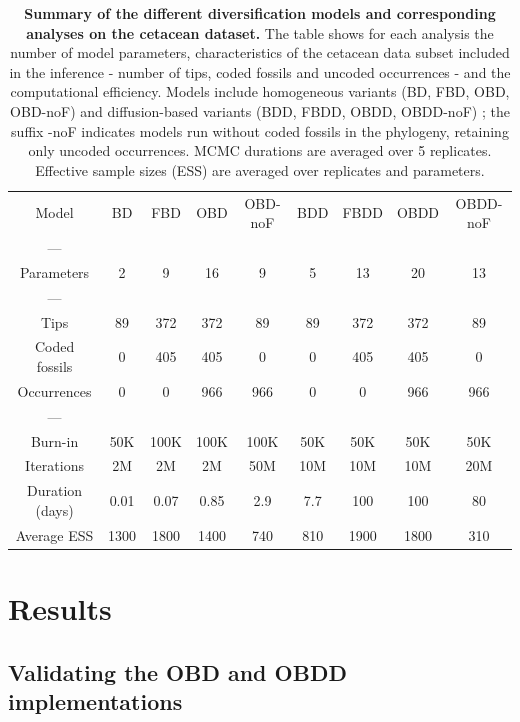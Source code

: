 \documentclass[oupdraft]{sysbio}
\newcommand{\revised}[1]{{\color{blue} #1}}
\begin{document}
\begin{table}[!ht]
    \centering
    \caption{\textbf{Summary of the different diversification models and corresponding analyses on the cetacean dataset.} The table shows for each analysis the number of model parameters, characteristics of the cetacean data subset included in the inference - number of tips, \revised{coded} fossils and \revised{uncoded} occurrences - and the computational efficiency. Models include homogeneous variants (BD, FBD, OBD, OBD-noF) and diffusion-based variants (BDD, FBDD, OBDD, OBDD-noF) ; the suffix -noF indicates models run without \revised{coded} fossils in the phylogeny, retaining only \revised{uncoded} occurrences. MCMC durations are averaged over 5 replicates. Effective sample sizes (ESS) are averaged over replicates and parameters.}
    \begin{tabular}{ccccccccc}
         Model & BD & FBD & OBD & OBD-noF & BDD& FBDD& OBDD& OBDD-noF\\
         ---\\
         Parameters & 2 & 9 & 16 & 9 & 5 & 13 & 20 & 13\\
         ---\\
         Tips & 89 & 372 & 372 & 89 & 89 & 372 & 372 & 89\\
         \revised{Coded} fossils & 0 & 405 & 405 & 0 & 0 & 405 & 405 & 0\\
         Occurrences & 0 & 0 & 966 & 966 & 0 & 0 & 966 & 966\\
         ---\\
         Burn-in & 50K & 100K & 100K & 100K & 50K & 50K & 50K& 50K\\
         Iterations & 2M & 2M & 2M & 50M & 10M & 10M & 10M & 20M\\
         Duration (days) & 0.01 & 0.07 & 0.85 & 2.9 & 7.7 & 100 & 100 & 80 \\
         Average ESS & 1300 & 1800 & 1400 & 740 & 810 & 1900 & 1800 & 310 \\
    \end{tabular}
    \label{tab:models}
\end{table}

\FloatBarrier
\section{Results}
\subsection{Validating the OBD and OBDD implementations}
\end{document}
